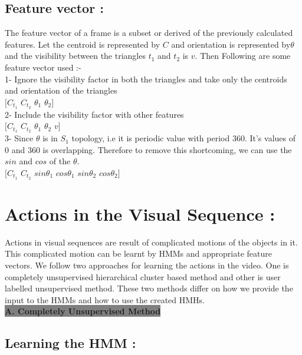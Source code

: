 \documentclass[a4paper, 10pt, notitlepage]{report}
\begin{document}
\subsection{Feature vector :}
The feature vector of a frame is a subset or derived of the previously calculated features. Let the centroid is represented by $C$ and orientation is represented by$\theta$ and the visibility between the triangles $t_1$ and $t_2$ is $v$. Then Following are some feature vector used :-\\

1- Ignore the visibility factor in both the triangles and take only the centroids and orientation of the triangles \\
\hspace*{20pt} $[C_{t_1}$ $C_{t_2}$ $\theta_1$ $\theta_2]$\\
2- Include the visibility factor with other features\\
\hspace*{20pt} $[C_{t_1}$ $C_{t_2}$ $\theta_1$ $\theta_2$ $v]$\\
3- Since $\theta$ is in $S_1$ topology, i.e it is periodic value with period $360$. It's values of $0$ and $360$ is overlapping. Therefore to remove this shortcoming, we can use the $sin$ and $cos$ of the $\theta$.\\
\hspace*{20pt} $[C_{t_1}$  $C_{t_2}$  $sin\theta_1$  $cos\theta_1$  $sin\theta_2$  $cos\theta_2]$\\

\section{Actions in the Visual Sequence :}
Actions in visual sequences are result of complicated motions of the objects in it. This complicated motion can be learnt by HMMs and appropriate feature vectors. We follow two approaches for learning the actions in the video. One is completely unsupervised hierarchical cluster based method and other is user labelled unsupervised method. These two methods differ on how we provide the input to the HMMs and how to use the created HMHs.\\

\colorbox{gray}{\Large \bf A. Completely Unsupervised Method} 

\subsection{Learning the HMM :}
\end{document}
